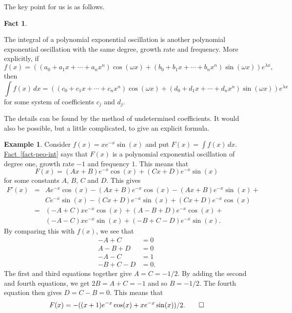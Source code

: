 \documentclass[a4paper]{book}
\newcommand{\lm}        {\lambda}
\newcommand{\om}        {\omega}
\renewcommand{\:}{\colon}
\newcommand{\bilabel}[1]{\hypertarget{#1}{\label{#1}}}
\newcommand{\biref}[2]{\hyperlink{#2}{#1~\ref*{#2}}}
\theoremstyle{definition}
\newtheorem{fact}[theorem]{Fact}
\newtheorem{example}[theorem]{Example}
\begin{document}
The key point for us is as follows.
\begin{fact}\bilabel{fact-peo-int}
 The integral of a polynomial exponential oscillation is another
 polynomial exponential oscillation with the same degree, growth rate
 and frequency.  More explicitly, if 
 \[ f(x)= ((a_0+a_1x+\dotsb+a_nx^n)\cos(\om x) + 
           (b_0+b_1x+\dotsb+b_nx^n)\sin(\om x)) e^{\lm x},
 \]
 then
 \[ \int f(x)\, dx 
        = ((c_0+c_1x+\dotsb+c_nx^n)\cos(\om x) + 
           (d_0+d_1x+\dotsb+d_nx^n)\sin(\om x)) e^{\lm x}
 \]
 for some system of coefficients $c_j$ and $d_j$.

 The details can be found by the method of
 undetermined coefficients.  It would also be possible, but a little
 complicated, to give an explicit formula.
\end{fact}
\begin{example}
 Consider $f(x)=xe^{-x}\sin(x)$ and put $F(x)=\int f(x)\,dx$.  
 \biref{Fact}{fact-peo-int} says that $F(x)$ is a polynomial
 exponential oscillation of degree one, growth rate $-1$ and frequency
 $1$.  This means that 
 \[ F(x) = (Ax+B)e^{-x}\cos(x) + (Cx+D)e^{-x}\sin(x) \]
 for some constants $A$, $B$, $C$ and $D$.  This gives
 \begin{eqnarray*}
  F'(x)
  &=& Ae^{-x}\cos(x) - (Ax+B)e^{-x}\cos(x) - (Ax+B)e^{-x}\sin(x) + \\
  &&  Ce^{-x}\sin(x) - (Cx+D)e^{-x}\sin(x) + (Cx+D)e^{-x}\cos(x) \\
  &=& (-A+C)xe^{-x}\cos(x) + (A-B+D)e^{-x}\cos(x) + \\
  &&  (-A-C)xe^{-x}\sin(x) + (-B+C-D)e^{-x}\sin(x).
 \end{eqnarray*}
 By comparing this with $f(x)$, we see that
 \begin{align*}
  -A+C &= 0 \\
  A-B+D &= 0 \\
  -A-C &= 1 \\
  -B+C-D &= 0.
 \end{align*}
 The first and third equations together give $A=C=-1/2$.  By adding
 the second and fourth equations, we get $2B=A+C=-1$ and so $B=-1/2$.
 The fourth equation then gives $D=C-B=0$.  This means that 
 \[ F(x) = -((x+1)e^{-x}\cos(x) + xe^{-x}\sin(x))/2. \qed \]
\end{example}
\end{document}
